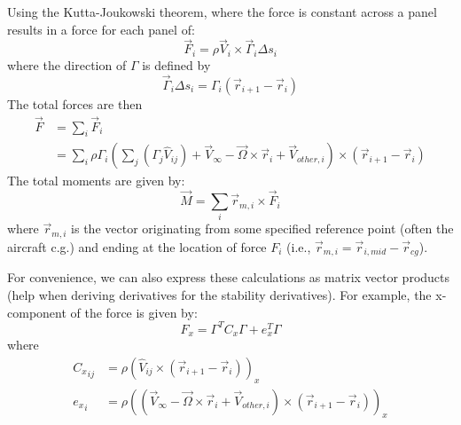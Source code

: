 \documentclass{article}
\begin{document}
Using the Kutta-Joukowski theorem, where the force is constant across a panel results in a force for each panel of:
\begin{equation}
\vec F_i = \rho \vec V_i \times \vec \Gamma_i \Delta s_i
\end{equation}
where the direction of $\Gamma$ is defined by
\begin{equation}
\vec \Gamma_i \Delta s_i = \Gamma_i (\vec{r}_{i+1} - \vec{r}_{i})
\end{equation}
The total forces are then
\begin{align}
\vec{F} &= \sum_i \vec{F}_i\\
&= \sum_i \rho \Gamma_i \left(\sum_j (\Gamma_j \hat{V}_{ij} ) + \vec{V}_\infty - \vec{\Omega} \times \vec{r}_i + \vec{V}_{other, i}\right)\times  (\vec{r}_{i+1} - \vec{r}_{i})
\label{eq:forces}
\end{align}
The total moments are given by:
\begin{equation}
\vec M = \sum_i \vec r_{m, i} \times \vec{F}_i
\end{equation}
where $\vec r_{m, i}$ is the vector originating from some specified reference point (often the aircraft c.g.) and ending at the location of force $F_i$ (i.e., $\vec r_{m, i} = \vec r_{i, mid} - \vec r_{cg}$).

For convenience, we can also express these calculations as matrix vector products (help when deriving derivatives for the stability derivatives).  For example, the x-component of the force is given by:
\begin{equation}
F_x  = \Gamma^T C_x \Gamma + e_x^T \Gamma
\label{eq:forcematrixvector}
\end{equation}
where
\begin{align}
{C_x}_{ij} &= \rho \left(\hat{V}_{ij} \times (\vec{r}_{i+1} - \vec{r}_{i})\right)_x\\
{e_x}_{i} &= \rho \left((\vec{V}_\infty - \vec{\Omega} \times \vec{r}_i + \vec{V}_{other, i}) \times (\vec{r}_{i+1} - \vec{r}_{i})\right)_x
\end{align}
\end{document}
